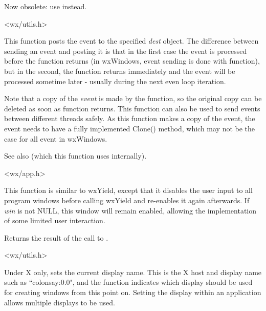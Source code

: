 Now obsolete: use  instead.


<wx/utils.h>

\label{wxpostevent}


This function posts the event to the specified {\it dest} object. The
difference between sending an event and posting it is that in the first case
the event is processed before the function returns (in wxWindows, event sending
is done with  function), but in
the second, the function returns immediately and the event will be processed
sometime later - usually during the next even loop iteration.

Note that a copy of the {\it event} is made by the function, so the original
copy can be deleted as soon as function returns. This function can also be used
to send events between different threads safely. As this function makes a
copy of the event, the event needs to have a fully implemented Clone() method,
which may not be the case for all event in wxWindows.

See also  (which this function
uses internally).


<wx/app.h>

\label{wxsafeyield}


This function is similar to wxYield, except that it disables the user input to
all program windows before calling wxYield and re-enables it again
afterwards. If {\it win} is not NULL, this window will remain enabled,
allowing the implementation of some limited user interaction.

Returns the result of the call to .


<wx/utils.h>

\label{wxsetdisplayname}


Under X only, sets the current display name. This is the X host and display name such
as ``colonsay:0.0", and the function indicates which display should be used for creating
windows from this point on. Setting the display within an application allows multiple
displays to be used.

